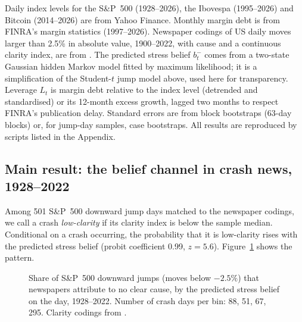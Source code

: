\documentclass[11pt,a4paper]{article}
\theoremstyle{remark}
\begin{document}
Daily index levels for the S\&P~500 (1928--2026), the Ibovespa (1995--2026) and Bitcoin
(2014--2026) are from Yahoo Finance. Monthly margin debt is from FINRA's margin statistics
(1997--2026). Newspaper codings of US daily moves larger than 2.5\% in absolute value,
1900--2022, with cause and a continuous clarity index, are from \citet{BBDS2021}. The
predicted stress belief $b^-_t$ comes from a two-state Gaussian hidden Markov model fitted
by maximum likelihood; it is a simplification of the Student-$t$ jump model above, used here
for transparency. Leverage $L_t$ is margin debt relative to the index level (detrended and
standardised) or its 12-month excess growth, lagged two months to respect FINRA's
publication delay. Standard errors are from block bootstraps (63-day blocks) or, for
jump-day samples, case bootstraps. All results are reproduced by scripts listed in the
Appendix.

\subsection{Main result: the belief channel in crash news, 1928--2022}

Among 501 S\&P~500 downward jump days matched to the newspaper codings, we call a crash
\emph{low-clarity} if its clarity index is below the sample median. Conditional on a crash
occurring, the probability that it is low-clarity rises with the predicted stress belief
(probit coefficient 0.99, $z=5.6$). Figure~\ref{fig:clarity} shows the pattern.

\begin{figure}[ht]
\centering
{}
\caption{Share of S\&P~500 downward jumps (moves below $-2.5\%$) that newspapers attribute to
no clear cause, by the predicted stress belief on the day, 1928--2022. Number of crash days
per bin: 88, 51, 67, 295. Clarity codings from \citet{BBDS2021}.}
\label{fig:clarity}
\end{figure}
\end{document}
